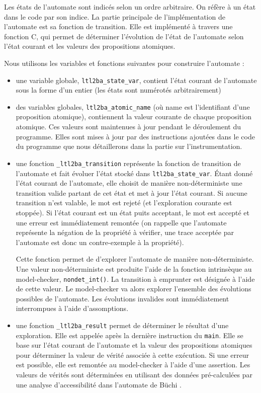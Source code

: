 Les états de l'automate sont indicés selon un ordre arbitraire. On réfère à un
état dans le code par son indice. La partie principale de l'implémentation de
l'automate est sa fonction de transition. Elle est implémenté à travers une
fonction C, qui permet de déterminer l'évolution de l'état de l'automate selon
l'état courant et les valeurs des propositions atomiques.

Nous utilisons les variables et fonctions suivantes pour construire l'automate :

\begin{itemize}
\item
  une variable globale, \texttt{ltl2ba\_state\_var}, contient l'état
  courant de l'automate sous la forme d'un entier (les états sont
  numérotés arbitrairement)
\item
  des variables globales, \texttt{ltl2ba\_atomic\_{name}} (où name est
  l'identifiant d'une proposition atomique), contiennent la valeur
  courante de chaque proposition atomique. Ces valeurs sont maintenues à
  jour pendant le déroulement du programme. Elles sont mises à jour par
  des instructions ajoutées dans le code du programme que nous
  détaillerons dans la partie sur l'instrumentation.
\item
  une fonction \texttt{\_ltl2ba\_transition} représente la fonction de
  transition de l'automate et fait évoluer l'état stocké dans
  \texttt{ltl2ba\_state\_var}. Étant donné l'état courant de
  l'automate, elle choisit de manière non-déterministe une transition
  valide partant de cet état et met à jour l'état courant. Si aucune
  transition n'est valable, le mot est rejeté (et l'exploration courante
  est stoppée). Si l'état courant est un état puits acceptant, le mot
  est accepté et une erreur est immédiatement remontée (on rappelle que
  l'automate représente la négation de la propriété à vérifier, une
  trace acceptée par l'automate est donc un contre-exemple à la
  propriété).

  Cette fonction permet de d'explorer l'automate de manière
  non-déterministe. Une valeur non-déterministe est produite l'aide de
  la fonction intrinsèque au model-checker, \texttt{nondet\_int()}. La
  transition à emprunter est désignée à l'aide de cette valeur. Le
  model-checker va alors explorer l'ensemble des évolutions possibles de
  l'automate. Les évolutions invalides sont immédiatement interrompues à
  l'aide d'assomptions.
\item
  une fonction \texttt{\_ltl2ba\_result} permet de déterminer le
  résultat d'une exploration. Elle est appelée après la dernière
  instruction du \texttt{main}. Elle se base sur l'état courant de
  l'automate et la valeur des propositions atomiques pour déterminer la
  valeur de vérité associée à cette exécution. Si une erreur est
  possible, elle est remontée au model-checker à l'aide d'une assertion.
  Les valeurs de vérités sont déterminées en utilisant des données
  pré-calculées par une analyse d'accessibilité dans l'automate de Büchi
  \cite{morse_ltl}.
\end{itemize}

